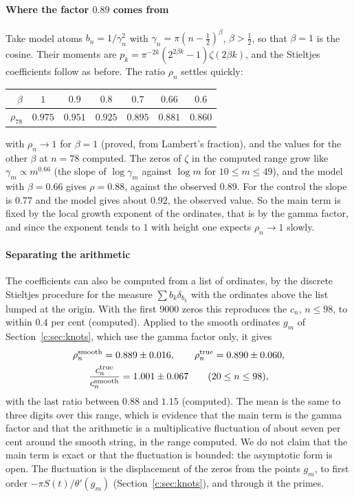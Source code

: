 \paragraph{Where the factor $0.89$ comes from} Take model atoms $b_n=1/\gamma_n^2$ with $\gamma_n=\pi(n-\frac12)^\beta$, $\beta>\frac12$, so that $\beta=1$ is the cosine. Their moments are $p_k=\pi^{-2k}(2^{2\beta k}-1)\zeta(2\beta k)$, and the Stieltjes coefficients follow as before. The ratio $\rho_n$ settles quickly:
\begin{center}
\footnotesize
\begin{tabular}{rcccccc}
\toprule
$\beta$ & $1$ & $0.9$ & $0.8$ & $0.7$ & $0.66$ & $0.6$\\
\midrule
$\rho_{78}$ & $0.975$ & $0.951$ & $0.925$ & $0.895$ & $0.881$ & $0.860$\\
\bottomrule
\end{tabular}
\end{center}
with $\rho_n\to1$ for $\beta=1$ (proved, from Lambert's fraction), and the values for the other $\beta$ at $n=78$ computed. The zeros of $\zeta$ in the computed range grow like $\gamma_m\propto m^{0.66}$ (the slope of $\log\gamma_m$ against $\log m$ for $10\le m\le49$), and the model with $\beta=0.66$ gives $\rho=0.88$, against the observed $0.89$. For the control the slope is $0.77$ and the model gives about $0.92$, the observed value. So the main term is fixed by the local growth exponent of the ordinates, that is by the gamma factor, and since the exponent tends to $1$ with height one expects $\rho_n\to1$ slowly.

\paragraph{Separating the arithmetic} The coefficients can also be computed from a list of ordinates, by the discrete Stieltjes procedure for the measure $\sum b_k\delta_{b_k}$ with the ordinates above the list lumped at the origin. With the first $9000$ zeros this reproduces the $c_n$, $n\le98$, to within $0.4$ per cent (computed). Applied to the smooth ordinates $g_m$ of Section~\ref{c:sec:knots}, which use the gamma factor only, it gives
\begin{gather*}
\rho_n^{\rm smooth}=0.889\pm0.016,\qquad\rho_n^{\rm true}=0.890\pm0.060,\\
\frac{c_n^{\rm true}}{c_n^{\rm smooth}}=1.001\pm0.067\qquad(20\le n\le98),
\end{gather*}
with the last ratio between $0.88$ and $1.15$ (computed). The mean is the same to three digits over this range, which is evidence that the main term is the gamma factor and that the arithmetic is a multiplicative fluctuation of about seven per cent around the smooth string, in the range computed. We do not claim that the main term is exact or that the fluctuation is bounded: the asymptotic form is open. The fluctuation is the displacement of the zeros from the points $g_m$, to first order $-\pi S(t)/\theta'(g_m)$ (Section~\ref{c:sec:knots}), and through it the primes.

